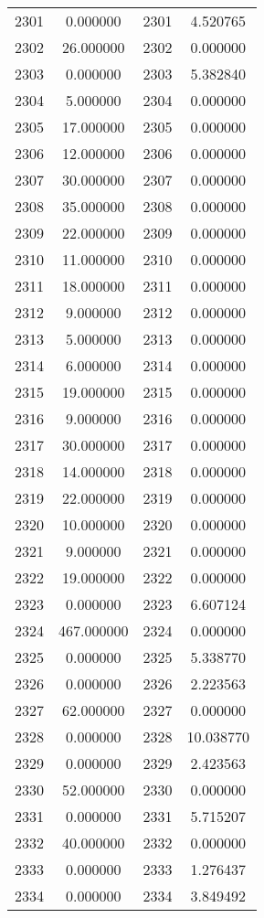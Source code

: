 \documentclass[12pt]{article}
\begin{document}
\begin{longtable}{@{}cccc@{}}
2301 & 0.000000 & 2301 & 4.520765 \\
2302 & 26.000000 & 2302 & 0.000000 \\
2303 & 0.000000 & 2303 & 5.382840 \\
2304 & 5.000000 & 2304 & 0.000000 \\
2305 & 17.000000 & 2305 & 0.000000 \\
2306 & 12.000000 & 2306 & 0.000000 \\
2307 & 30.000000 & 2307 & 0.000000 \\
2308 & 35.000000 & 2308 & 0.000000 \\
2309 & 22.000000 & 2309 & 0.000000 \\
2310 & 11.000000 & 2310 & 0.000000 \\
2311 & 18.000000 & 2311 & 0.000000 \\
2312 & 9.000000 & 2312 & 0.000000 \\
2313 & 5.000000 & 2313 & 0.000000 \\
2314 & 6.000000 & 2314 & 0.000000 \\
2315 & 19.000000 & 2315 & 0.000000 \\
2316 & 9.000000 & 2316 & 0.000000 \\
2317 & 30.000000 & 2317 & 0.000000 \\
2318 & 14.000000 & 2318 & 0.000000 \\
2319 & 22.000000 & 2319 & 0.000000 \\
2320 & 10.000000 & 2320 & 0.000000 \\
2321 & 9.000000 & 2321 & 0.000000 \\
2322 & 19.000000 & 2322 & 0.000000 \\
2323 & 0.000000 & 2323 & 6.607124 \\
2324 & 467.000000 & 2324 & 0.000000 \\
2325 & 0.000000 & 2325 & 5.338770 \\
2326 & 0.000000 & 2326 & 2.223563 \\
2327 & 62.000000 & 2327 & 0.000000 \\
2328 & 0.000000 & 2328 & 10.038770 \\
2329 & 0.000000 & 2329 & 2.423563 \\
2330 & 52.000000 & 2330 & 0.000000 \\
2331 & 0.000000 & 2331 & 5.715207 \\
2332 & 40.000000 & 2332 & 0.000000 \\
2333 & 0.000000 & 2333 & 1.276437 \\
2334 & 0.000000 & 2334 & 3.849492 \\

\end{longtable}
\end{document}

